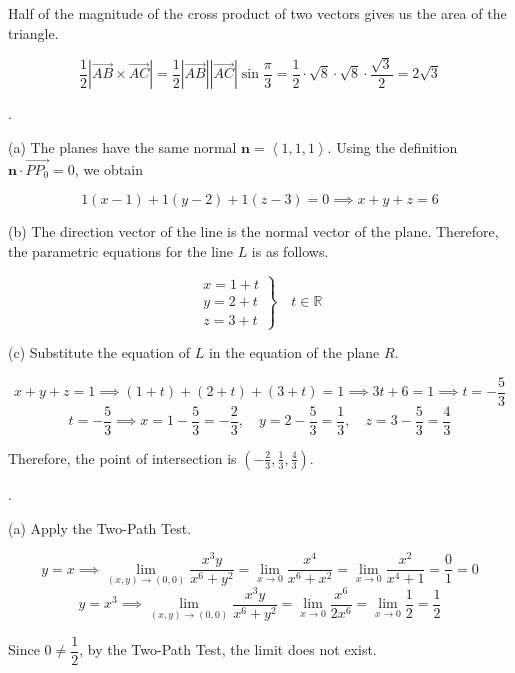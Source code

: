 \documentclass{article}
\begin{document}
\hfill

\noindent Half of the magnitude of the cross product of two vectors gives us the area of the triangle.

\[\frac12\left|\overrightarrow{AB}\times\overrightarrow{AC}\right|=\frac12\left|\overrightarrow{AB}\right|\left|\overrightarrow{AC}\right|\sin\frac\pi3=\frac12\cdot\sqrt8\cdot\sqrt8\cdot\frac{\sqrt3}2=\boxed{2\sqrt3}\]

\hfill

.

\hfill

\noindent (a) The planes have the same normal $\mathbf n=\left\langle1,1,1\right\rangle$. Using the definition $\mathbf n\cdot\overrightarrow{PP_0}=0$, we obtain

\[1(x-1)+1(y-2)+1(z-3)=0\implies\boxed{x+y+z=6}\]

\hfill

\noindent (b) The direction vector of the line is the normal vector of the plane. Therefore, the parametric equations for the line $L$ is as follows.

\[\boxed{\left.\begin{array}{l}
x=1+t\\
y=2+t\\
z=3+t
\end{array}\right\}\quad t\in\mathbb{R}}\]

\hfill

\noindent (c) Substitute the equation of $L$ in the equation of the plane $R$.

\[x+y+z=1\implies (1+t)+(2+t)+(3+t)=1\implies 3t+6=1\implies t=-\frac53\]
\[t=-\frac53\implies x=1-\frac53=-\frac23,\quad y=2-\frac53=\frac13,\quad z=3-\frac53=\frac43\]

\hfill

\noindent Therefore, the point of intersection is $\boxed{\left(-\frac23,\frac13,\frac43\right)}$.

\hfill

. 

\hfill

\noindent (a) Apply the Two-Path Test.

\[y=x\implies\lim_{(x,y)\to(0,0)}\frac{x^3y}{x^6+y^2}=\lim_{x\to0}\frac{x^4}{x^6+x^2}=\lim_{x\to0}\frac{x^2}{x^4+1}=\frac01=0\]
\[y=x^3\implies\lim_{(x,y)\to(0,0)}\frac{x^3y}{x^6+y^2}=\lim_{x\to0}\frac{x^6}{2x^6}=\lim_{x\to0}\frac12=\frac12\]

\hfill

\noindent Since $0\neq\dfrac12$, by the Two-Path Test, the limit does not exist.
\end{document}
